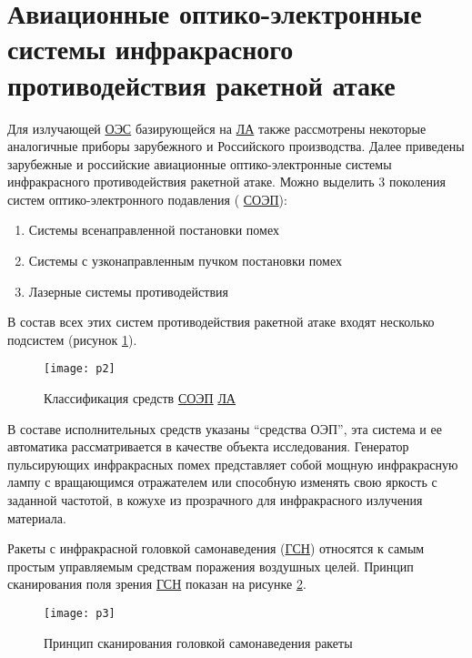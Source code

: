 \section{Авиационные оптико-электронные системы инфракрасного противодействия ракетной атаке} \label{sec:ch1/sec2-}

Для излучающей  \hyperref[acroEOS]{ОЭС} базирующейся на  \hyperref[acroLA]{ЛА} также рассмотрены некоторые аналогичные приборы зарубежного и Российского производства. Далее приведены зарубежные и российские авиационные оптико-электронные системы инфракрасного противодействия ракетной атаке. Можно выделить 3 поколения систем оптико-электронного подавления ( \hyperref[acroSOEP]{СОЭП}):

\begin{enumerate}
	\item Системы всенаправленной постановки помех
	\item Системы с узконаправленным пучком постановки помех
	\item Лазерные системы противодействия 	
\end{enumerate}

В состав всех этих систем противодействия ракетной атаке входят несколько подсистем (рисунок \ref{fig:classification})\cite[]{ForeignMilitary}.

\begin{figure}[ht]
	\centering
	\texttt{[image: p2]} 
	\caption{Классификация средств  \hyperref[acroSOEP]{СОЭП}  \hyperref[acroLA]{ЛА} \cite[]{ForeignMilitary}}
	\label{fig:classification}
\end{figure}

В составе исполнительных средств указаны “средства ОЭП”, эта система и ее автоматика рассматривается в качестве объекта исследования. Генератор пульсирующих инфракрасных помех представляет собой мощную инфракрасную лампу с вращающимся отражателем или способную изменять свою яркость с заданной частотой, в кожухе из прозрачного для инфракрасного излучения материала.

Ракеты с инфракрасной головкой самонаведения (\hyperref[acroGSN]{ГСН}) относятся к самым простым управляемым средствам поражения воздушных целей. Принцип сканирования поля зрения \hyperref[acroGSN]{ГСН} показан на рисунке \ref{fig:rocketScanning}. 

\begin{figure}[ht]
	\centering
	\texttt{[image: p3]} 
	\caption{Принцип сканирования головкой самонаведения ракеты}
	\label{fig:rocketScanning}
\end{figure}

